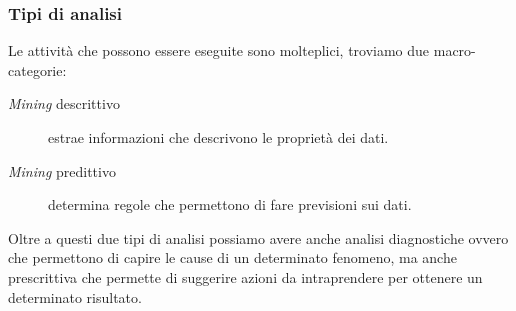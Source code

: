     \subsubsection{Tipi di analisi}
        Le attività che possono essere eseguite sono molteplici, troviamo due macro-categorie:
        \begin{description}
            \item[\textit{Mining} descrittivo] estrae informazioni che descrivono le proprietà dei dati.
            \item[\textit{Mining} predittivo] determina regole che permettono di fare previsioni sui dati. 
        \end{description}
        Oltre a questi due tipi di analisi possiamo avere anche analisi diagnostiche ovvero che permettono di capire le cause di un determinato fenomeno, ma anche prescrittiva che permette di suggerire azioni da intraprendere per ottenere un determinato risultato.